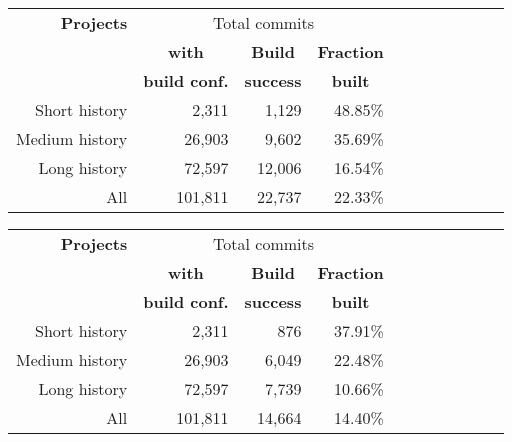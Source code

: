 \begin{table*}[h]
  \caption{Compilable snapshots - Totals (top: Reduced Original Study, bottom: Replication Study).}
  \label{table:replication-compilability-2}
  \begin{center}
  
  \begin{tabular}{r|rrrrrrr|rrr}
  \toprule
    \bf{Projects} & \multicolumn{3}{c}{Total commits} \\
                  & \multicolumn{1}{c}{\bf{with}} & \multicolumn{1}{c}{\bf{Build}} & \multicolumn{1}{c}{\bf{Fraction}} \\
                  & \bf{build conf.} & \bf{success} & \multicolumn{1}{c}{\bf{built}}\\  
  \midrule
  Short history  &   2,311 &  1,129 & 48.85\% \\ 
  Medium history &  26,903 &  9,602 & 35.69\% \\
  Long history   &  72,597 & 12,006 & 16.54\% \\
  \midrule
  All            & 101,811 & 22,737 & 22.33\% \\ 
  \bottomrule
  \end{tabular}
  \end{center}
  
  \begin{center}
  \begin{tabular}{r|rrrrrrr|rrr}
    \toprule
    \bf{Projects} & \multicolumn{3}{c}{Total commits} \\
                  & \multicolumn{1}{c}{\bf{with}} & \multicolumn{1}{c}{\bf{Build}} & \multicolumn{1}{c}{\bf{Fraction}} \\
                  & \bf{build conf.} & \bf{success} & \multicolumn{1}{c}{\bf{built}}\\  
  \midrule
  Short history  &   2,311 &    876 & 37.91\%\\ 
  Medium history &  26,903 &  6,049 & 22.48\%\\ 
  Long history   &  72,597 &  7,739 & 10.66\%\\ 
  \midrule
  All            & 101,811 & 14,664 & 14.40\%\\ 
  \bottomrule
  \end{tabular}
  \end{center}
  \end{table*}



